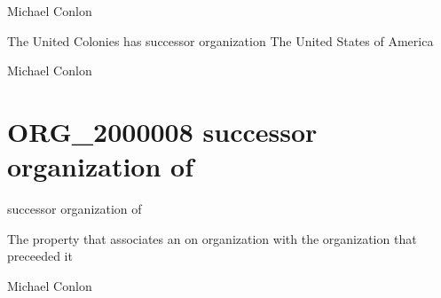 \documentclass[letterpaper,10pt,english]{sphinxmanual}
\begin{document}
\begin{sphinxShadowBox}

\sphinxAtStartPar
Michael Conlon 
\end{sphinxShadowBox}

\begin{sphinxShadowBox}

\sphinxAtStartPar
The United Colonies has successor organization The United States of America
\end{sphinxShadowBox}

\begin{sphinxShadowBox}

\sphinxAtStartPar
Michael Conlon 
\end{sphinxShadowBox}
\begin{quote}
\label{\detokenize{doc-ORG_2000008:org-2000008}}\label{\detokenize{doc-ORG_2000008:successor-organization-of}}\label{\detokenize{doc-ORG_2000008:org-2000008}}
\ignorespaces \end{quote}


\section{ORG\_2000008 \sphinxhyphen{} successor organization of}
\label{\detokenize{doc-ORG_2000008:org-2000008-successor-organization-of}}\label{\detokenize{doc-ORG_2000008:index-0}}\label{\detokenize{doc-ORG_2000008::doc}}
\begin{sphinxShadowBox}

\sphinxAtStartPar
successor organization of
\end{sphinxShadowBox}

\begin{sphinxShadowBox}

\sphinxAtStartPar
The property that associates an on organization with the organization that preceeded it
\end{sphinxShadowBox}

\begin{sphinxShadowBox}

\sphinxAtStartPar
Michael Conlon 
\end{sphinxShadowBox}
\end{document}
